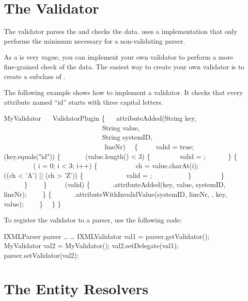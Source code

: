 \section{The \NanoXML{} Validator}

The validator parses the  and checks the \XML{} data.
 uses a  implementation that only performs the minimum necessary for a non-validating parser.

As a  is very vague, you can implement your own validator to perform a more fine-grained check of the \XML{} data.
The easiest way to create your own validator is to create a subclass of .

The following example shows how to implement a validator.
It checks that every attribute named ``id'' starts with three capital letters.

\begin{example}
 MyValidator
~~ ValidatorPlugin
\{
~~ attributeAdded(String key,
~~~~~~~~~~~~~~~~~~~~~~~~~~~~~String value,
~~~~~~~~~~~~~~~~~~~~~~~~~~~~~String systemID,
~~~~~~~~~~~~~~~~~~~~~~~~~~~~~ lineNr)
~~\{
~~~~ valid = true;
~~~~ (key.equals("id")) \{
~~~~~~ (value.length() < 3) \{
~~~~~~~~valid = ;
~~~~~~\}  \{
~~~~~~~~ ( i = 0; i < 3; i++) \{
~~~~~~~~~~ ch = value.charAt(i);
~~~~~~~~~~ ((ch < 'A') || (ch > 'Z')) \{
~~~~~~~~~~~~valid = ;
~~~~~~~~~~\}
~~~~~~~~\}
~~~~~~\}
~~~~\}
~~~~ (valid) \{
~~~~~~.attributeAdded(key, value, systemID, lineNr);
~~~~\}  \{
~~~~~~.attributeWithInvalidValue(systemID, lineNr, , key, value);
~~~~\}
~~\}
\}
\end{example}

To register the validator to a parser, use the following code:

\begin{example}
IXMLParser parser \ldots
\ldots
IXMLValidator val1 = parser.getValidator();
MyValidator val2 =  MyValidator();
val2.setDelegate(val1);
parser.setValidator(val2);
\end{example}


\section{The \NanoXML{} Entity Resolvers}

